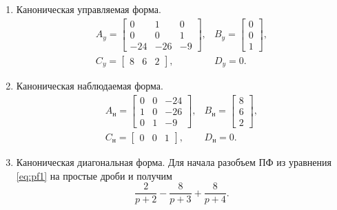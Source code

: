 \begin{enumerate}
    \item Каноническая управляемая форма.
\begin{equation*}
    \begin{array}{cc}
        A_y=\begin{bmatrix}
            0 & 1 & 0 \\
            0 & 0 & 1 \\
            -24 & -26 & -9
        \end{bmatrix}, &
        B_y=\begin{bmatrix}
            0 \\ 0 \\ 1
        \end{bmatrix}, \\[7mm]
        C_y=\begin{bmatrix}
            8 & 6 & 2
        \end{bmatrix}, &
        D_y=0.
    \end{array}
\end{equation*}
    \item Каноническая наблюдаемая форма.
    \begin{equation*}
        \begin{array}{cc}
            A_\text{н}=\begin{bmatrix}
                0 & 0 & -24 \\
                1 & 0 & -26 \\
                0 & 1 & -9
            \end{bmatrix}, &
            B_\text{н}=\begin{bmatrix}
                8 \\ 6 \\ 2
            \end{bmatrix}, \\[7mm]
            C_\text{н}=\begin{bmatrix}
                0 & 0 & 1
            \end{bmatrix}, &
            D_\text{н}=0.
        \end{array}
    \end{equation*}
    \item Каноническая диагональная форма.
    Для начала разобъем ПФ из уравнения \ref{eq:pf1} на простые дроби и получим
    \begin{equation*}
        \frac{2}{p+2}-\frac{8}{p+3}+\frac{8}{p+4}.
    \end{equation*}

\end{enumerate}
